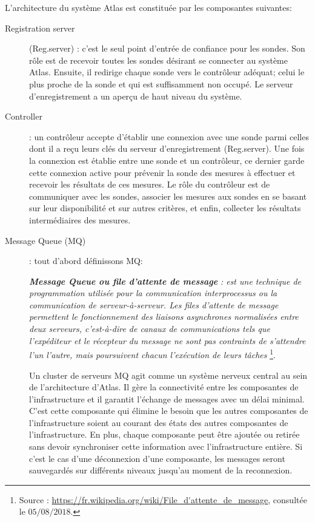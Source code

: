 L'architecture du système Atlas est constituée par  les composantes suivantes:
\begin{description}
	\item [Registration server] (Reg.server) : c'est le seul point d'entrée de confiance pour les sondes. Son rôle est de recevoir toutes les sondes désirant se connecter au système  Atlas. Ensuite, il redirige chaque sonde vers le contrôleur adéquat; celui  le plus proche de la sonde et qui est  suffisamment non occupé.  Le serveur d'enregistrement  a un aperçu de haut niveau du système.
	
	\item [Controller]: un contrôleur accepte d'établir une connexion avec une sonde parmi celles dont il a reçu leurs clés du serveur d'enregistrement (Reg.server). Une fois la connexion est établie entre une sonde et un contrôleur, ce dernier garde cette connexion active pour  prévenir la sonde des mesures à effectuer et recevoir les résultats de ces mesures.  Le rôle du contrôleur est de communiquer avec les sondes,  associer les mesures aux sondes en se basant sur leur disponibilité  et sur autres critères, et enfin, collecter les résultats intermédiaires des mesures.
	
	\item [Message Queue (MQ)] : tout d'abord définissons MQ:
	\begin{tcolorbox}[title=Message Queue]
		\og    \textbf{\textit{Message Queue ou file d'attente de message}} \textit{:  est une technique de programmation utilisée pour la communication interprocessus ou la communication de serveur-à-serveur. Les files d'attente de message permettent le fonctionnement des liaisons asynchrones normalisées entre deux serveurs, c'est-à-dire de canaux de communications tels que l'expéditeur et le récepteur du message ne sont pas contraints de s'attendre l'un l'autre, mais poursuivent chacun l'exécution de leurs tâches} \footnote{Source : \url{https://fr.wikipedia.org/wiki/File\_d'attente\_de\_message}, consultée le $05/08/2018$.}. \fg{}
	\end{tcolorbox} 
	
	Un cluster de serveurs MQ  agit comme un système nerveux central au sein de l'architecture d'Atlas. Il gère la connectivité entre les composantes de l'infrastructure et  il garantit l'échange de messages avec un délai minimal. C'est cette composante qui élimine le besoin que les autres composantes de l'infrastructure soient au courant des états des autres composantes de l'infrastructure. En plus, chaque composante peut être ajoutée ou retirée sans devoir synchroniser cette information avec l'infrastructure entière. Si c'est le cas d'une déconnexion d'une composante, les messages seront sauvegardés sur différents niveaux jusqu'au moment de la reconnexion.
	

\end{description}
